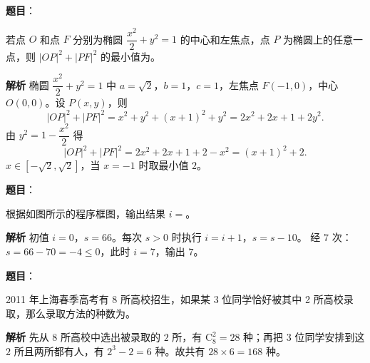 \begin{answer}

\textbf{题目}：

若点 $O$ 和点 $F$ 分别为椭圆 $\dfrac{x^2}{2}+y^2=1$ 的中心和左焦点，点 $P$ 为椭圆上的任意一点，则 $|OP|^2+|PF|^2$ 的最小值为\gkblank{}。

\textbf{解析}
椭圆 $\dfrac{x^2}2+y^2=1$ 中 $a=\sqrt2$，$b=1$，$c=1$，左焦点 $F(-1,0)$，中心 $O(0,0)$。设 $P(x,y)$，则
\nopagebreak[4]
\[|OP|^2+|PF|^2=x^2+y^2+(x+1)^2+y^2=2x^2+2x+1+2y^2.\]
由 $y^2=1-\dfrac{x^2}2$ 得
\nopagebreak[4]
\[|OP|^2+|PF|^2=2x^2+2x+1+2-x^2=(x+1)^2+2.\]
$x\in[-\sqrt2,\sqrt2]$，当 $x=-1$ 时取最小值 $2$。


\end{answer}
\begin{answer}

\textbf{题目}：

根据如图所示的程序框图，输出结果 $i=$\gkblank{}。
\nopagebreak[4]
\begin{center}\end{center}
\nopagebreak[4]
\textbf{解析}
初值 $i=0$，$s=66$。每次 $s>0$ 时执行 $i=i+1$，$s=s-10$。
经 $7$ 次：$s=66-70=-4\leqslant0$，此时 $i=7$，输出 $7$。


\end{answer}
\begin{answer}

\textbf{题目}：

2011 年上海春季高考有 8 所高校招生，如果某 3 位同学恰好被其中 2 所高校录取，那么录取方法的种数为\gkblank{}。

\textbf{解析}
先从 $8$ 所高校中选出被录取的 $2$ 所，有 $\mathrm C_8^2=28$ 种；再把 $3$ 位同学安排到这 $2$ 所且两所都有人，有 $2^3-2=6$ 种。故共有 $28\times6=168$ 种。


\end{answer}
